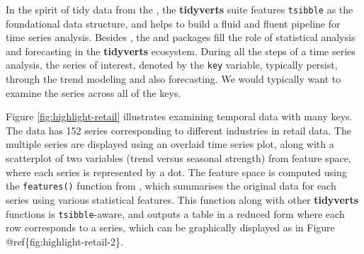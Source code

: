 In the spirit of tidy data from the 
\citep{Wickham2019}, the \textbf{tidyverts} suite features
\texttt{tsibble} as the foundational data structure, and helps to build
a fluid and fluent pipeline for time series analysis. Besides
, the  \citep{R-feasts} and
 \citep{R-fable} packages fill the role of statistical
analysis and forecasting in the \textbf{tidyverts} ecosystem. During all
the steps of a time series analysis, the series of interest, denoted by
the \texttt{key} variable, typically persist, through the trend modeling
and also forecasting. We would typically want to examine the series
across all of the keys.

Figure \ref{fig:highlight-retail} illustrates examining temporal data
with many keys. The data has 152 series corresponding to different
industries in retail data. The multiple series are displayed using an
overlaid time series plot, along with a scatterplot of two variables
(trend versus seasonal strength) from feature space, where each series
is represented by a dot. The feature space is computed using the
\texttt{features()} function from , which summarises the
original data for each series using various statistical features. This
function along with other \textbf{tidyverts} functions is
\texttt{tsibble}-aware, and outputs a table in a reduced form where each
row corresponds to a series, which can be graphically displayed as in
Figure @ref\{fig:highlight-retail-2\}.

